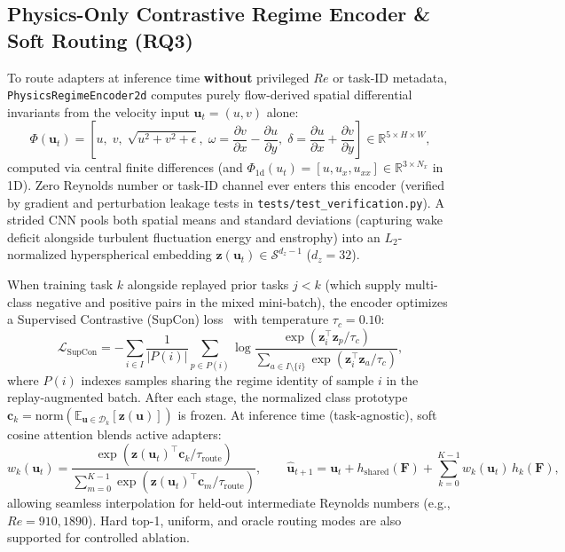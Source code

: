 \documentclass[11pt,a4paper]{article}
\begin{document}
\subsection{Physics-Only Contrastive Regime Encoder \& Soft Routing (RQ3)}

To route adapters at inference time \textbf{without} privileged $Re$ or task-ID metadata, \texttt{PhysicsRegimeEncoder2d} computes purely flow-derived spatial differential invariants from the velocity input $\mathbf{u}_t = (u, v)$ alone:
\begin{equation}
\Phi(\mathbf{u}_t) = \left[u, \; v, \; \sqrt{u^2 + v^2 + \epsilon}, \; \omega = \frac{\partial v}{\partial x} - \frac{\partial u}{\partial y}, \; \delta = \frac{\partial u}{\partial x} + \frac{\partial v}{\partial y}\right] \in \mathbb{R}^{5 \times H \times W},
\end{equation}
computed via central finite differences (and $\Phi_{1\text{d}}(u_t) = [u, u_x, u_{xx}] \in \mathbb{R}^{3 \times N_x}$ in 1D). Zero Reynolds number or task-ID channel ever enters this encoder (verified by gradient and perturbation leakage tests in \texttt{tests/test\_verification.py}). A strided CNN pools both spatial means and standard deviations (capturing wake deficit alongside turbulent fluctuation energy and enstrophy) into an $L_2$-normalized hyperspherical embedding $\mathbf{z}(\mathbf{u}_t) \in \mathcal{S}^{d_z - 1}$ ($d_z = 32$).

When training task $k$ alongside replayed prior tasks $j < k$ (which supply multi-class negative and positive pairs in the mixed mini-batch), the encoder optimizes a Supervised Contrastive (SupCon) loss~\cite{khosla2020supcon} with temperature $\tau_c = 0.10$:
\begin{equation}
\mathcal{L}_{\text{SupCon}} = -\sum_{i \in I} \frac{1}{|P(i)|} \sum_{p \in P(i)} \log \frac{\exp(\mathbf{z}_i^{\top} \mathbf{z}_p / \tau_c)}{\sum_{a \in I \setminus \{i\}} \exp(\mathbf{z}_i^{\top} \mathbf{z}_a / \tau_c)},
\end{equation}
where $P(i)$ indexes samples sharing the regime identity of sample $i$ in the replay-augmented batch. After each stage, the normalized class prototype $\mathbf{c}_k = \text{norm}(\mathbb{E}_{\mathbf{u} \in \mathcal{D}_k}[\mathbf{z}(\mathbf{u})])$ is frozen. At inference time (task-agnostic), soft cosine attention blends active adapters:
\begin{equation}
w_k(\mathbf{u}_t) = \frac{\exp(\mathbf{z}(\mathbf{u}_t)^{\top} \mathbf{c}_k / \tau_{\text{route}})}{\sum_{m=0}^{K-1} \exp(\mathbf{z}(\mathbf{u}_t)^{\top} \mathbf{c}_m / \tau_{\text{route}})}, \qquad \hat{\mathbf{u}}_{t+1} = \mathbf{u}_t + h_{\text{shared}}(\mathbf{F}) + \sum_{k=0}^{K-1} w_k(\mathbf{u}_t)\, h_k(\mathbf{F}),
\end{equation}
allowing seamless interpolation for held-out intermediate Reynolds numbers (e.g., $Re = 910, 1890$). Hard top-1, uniform, and oracle routing modes are also supported for controlled ablation.
\end{document}

